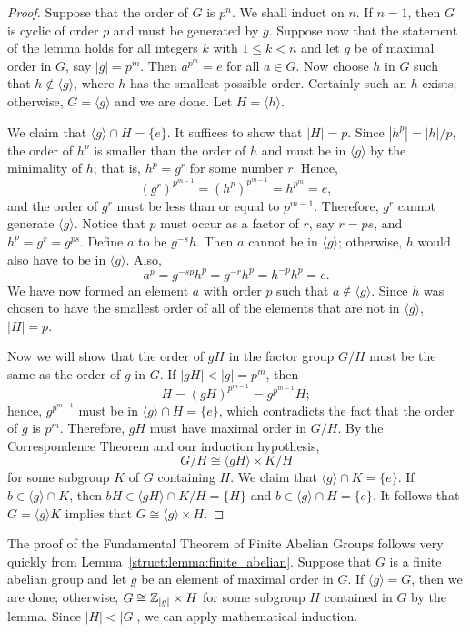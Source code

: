  
\begin{proof}
Suppose that the order of $G$ is $p^n$.  We shall induct on $n$. If
$n= 1$, then $G$ is cyclic of order $p$ and must be generated by $g$.
Suppose now that the statement of the lemma holds for all integers $k$
with $1 \leq k < n$ and let $g$ be of maximal order in $G$, say
$|g| = p^{m}$.  Then $a^{p^m} = e$ for all $a \in G$. Now choose $h$
in $G$ such that $h \notin \langle g \rangle$, where $h$ has the
smallest possible order.  Certainly such an $h$ exists; otherwise, $G
= \langle g \rangle$ and we are done.  Let $H = \langle h \rangle$.
 
 
We claim that $\langle g \rangle \cap H = \{ e \}$. It suffices to
show that $|H|=p$.  Since $|h^p| = |h| / p$, the order of $h^p$ is
smaller than the order of $h$ and must be in $\langle g \rangle$ by
the minimality of $h$; that is, $h^p = g^r$ for some number $r$.
Hence, 
\[
(g^r)^{p^{m-1}} = (h^p)^{p^{m-1}} = h^{p^{m}} = e,
\]
and the order of $g^r$ must be less than or equal to $p^{m-1}$.
Therefore, $g^r$ cannot generate $\langle g \rangle$.  Notice that $p$
must occur as a factor of $r$, say $r = ps$, and $h^p = g^r = g^{ps}$.
Define $a$ to be $g^{-s}h$. Then $a$ cannot be in $\langle g \rangle$;
otherwise, $h$ would also have to be in $\langle g \rangle$. Also, 
\[
a^p = g^{-sp} h^p = g^{-r} h^p = h^{-p} h^p = e.
\]
We have now formed an element $a$ with order $p$ such that $a \notin
\langle g \rangle$. Since $h$ was chosen to have the smallest order of
all of the elements that are not in $\langle g \rangle$, $|H|  = p$.
 
 
Now we will show that the order of $gH$ in the factor group $G/H$ 
must be the same as the order of $g$ in $G$.  If $|gH| < |g| = 
p^m$, then
\[
H = (gH)^{p^{m-1}} =  g^{p^{m-1}} H;
\]
hence, $g^{p^{m-1}}$ must be in $\langle g \rangle \cap H = \{ e \}$,
which contradicts the fact that the order of $g$ is $p^m$.  Therefore,
$gH$ must have maximal order in $G/H$.  By the Correspondence Theorem
and our induction hypothesis,
\[
G/H \cong \langle gH \rangle \times K/H
\]
for some subgroup $K$ of $G$ containing $H$.  We
claim that $\langle g \rangle \cap K = \{ e \}$. If $b \in \langle g
\rangle \cap K$, then $bH \in \langle gH \rangle \cap K/H =  \{ H \}$ and
$b \in \langle g \rangle \cap H = \{ e \}$. It follows that $G =
\langle g \rangle K$ implies that $G \cong \langle g \rangle \times H$. 
\end{proof}
 
\medskip


The proof of the Fundamental Theorem of Finite Abelian Groups follows
very quickly from Lemma~\ref{struct:lemma:finite_abelian}.  Suppose that $G$ is a finite abelian
group and let $g$ be an element of maximal order in $G$. If $\langle g
\rangle = G$, then we are done; otherwise, $G \cong {\Bbb Z}_{|g|}
\times H$ for some subgroup $H$ contained in $G$ by the lemma.  Since
$|H| < |G|$, we can apply mathematical induction.  
 
